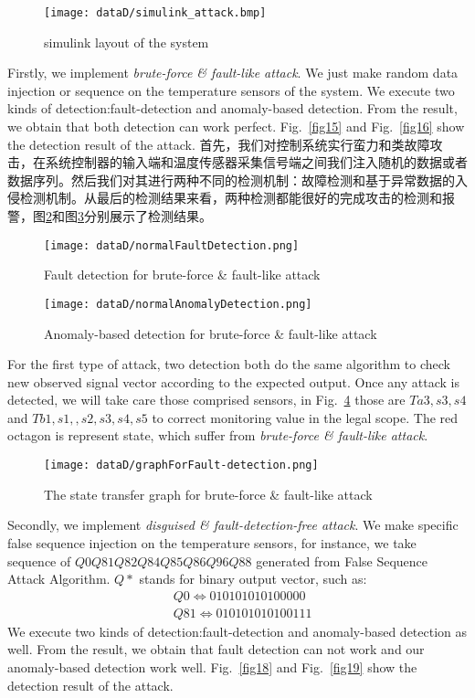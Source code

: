 	\begin{figure}[!htb]
		\centering
		\texttt{[image: dataD/simulink\_attack.bmp]}
		\caption{simulink layout of the system}
		\label{fig114}
	\end{figure}
	
	Firstly, we implement \textit{brute-force \& fault-like attack}. We just make random data injection or sequence on the temperature sensors of the system. We execute two kinds of detection:fault-detection and anomaly-based detection. From the result, we obtain that both detection can work perfect. Fig.~\ref{fig15} and Fig.~\ref{fig16} show the detection result of the attack.
	首先，我们对控制系统实行蛮力和类故障攻击，在系统控制器的输入端和温度传感器采集信号端之间我们注入随机的数据或者数据序列。然后我们对其进行两种不同的检测机制：故障检测和基于异常数据的入侵检测机制。从最后的检测结果来看，两种检测都能很好的完成攻击的检测和报警，图\ref{fig115}和图\ref{fig116}分别展示了检测结果。
	
	\begin{figure}[!htb]
		\centering
		\texttt{[image: dataD/normalFaultDetection.png]}
		\caption{Fault detection for brute-force \& fault-like attack}
		\label{fig115}
	\end{figure}
	
	\begin{figure}[!htb]
		\centering
		\texttt{[image: dataD/normalAnomalyDetection.png]}
		\caption{Anomaly-based detection for brute-force \& fault-like attack}
		\label{fig116}
	\end{figure}
	
	For the first type of attack, two detection both do the same algorithm to check new observed signal vector according to the expected output. Once any attack is detected, we will take care those comprised sensors, in 
	Fig.~\ref{fig17} those are $Ta3,s3,s4$ and $Tb1,s1,,s2,s3,s4,s5$ to correct monitoring value in the legal scope. The red octagon is represent state, which suffer from \textit{brute-force \& fault-like attack}.
	
	\begin{figure}[!htb]
		\centering
		\texttt{[image: dataD/graphForFault-detection.png]}
		\caption{The state transfer graph for brute-force \& fault-like attack}
		\label{fig17}
	\end{figure}
	
	Secondly, we implement \textit{disguised \& fault-detection-free attack}. We make specific false sequence injection on the temperature sensors, for instance, we take sequence of $Q0Q81Q82Q84Q85Q86Q96Q88
	$ generated from False Sequence Attack Algorithm. $Q*$ stands for binary output vector, such as:\[\begin{split}
	&Q0\Leftrightarrow 010101010100000\\
	&Q81\Leftrightarrow 010101010100111
	\end{split}
	\]  We execute two kinds of detection:fault-detection and anomaly-based detection as well. From the result, we obtain that fault detection can not work and our anomaly-based detection work well. Fig.~\ref{fig18} and Fig.~\ref{fig19} show the detection result of the attack.
	
